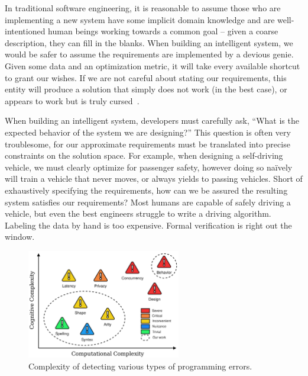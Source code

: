 In traditional software engineering, it is reasonable to assume those who are implementing a new system have some implicit domain knowledge and are well-intentioned human beings working towards a common goal -- given a coarse description, they can fill in the blanks. When building an intelligent system, we would be safer to assume the requirements are implemented by a devious genie. Given some data and an optimization metric, it will take every available shortcut to grant our wishes. If we are not careful about stating our requirements, this entity will produce a solution that simply does not work (in the best case), or appears to work but is truly cursed~\citep{bellman1957dynamic}.

When building an intelligent system, developers must carefully ask, ``What is the expected behavior of the system we are designing?'' This question is often very troublesome, for our approximate requirements must be translated into precise constraints on the solution space. For example, when designing a self-driving vehicle, we must clearly optimize for passenger safety, however doing so na\"ively will train a vehicle that never moves, or always yields to passing vehicles. Short of exhaustively specifying the requirements, how can we be assured the resulting system satisfies our requirements? Most humans are capable of safely driving a vehicle, but even the best engineers struggle to write a driving algorithm. Labeling the data by hand is too expensive. Formal verification is right out the window.

\begin{figure}
    \centering
    \includegraphics[width=0.60\textwidth]{../figures/verification_complexity.png}
    \caption{Complexity of detecting various types of programming errors.}
    \label{fig:verification_complexity}
\end{figure}

